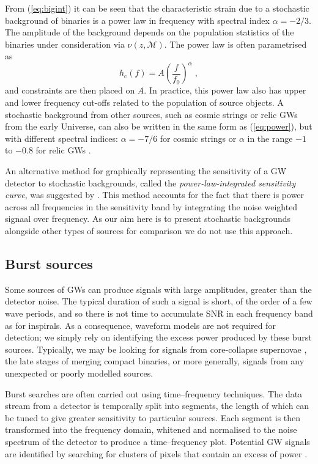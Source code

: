 From (\ref{eq:bigint}) it can be seen that the characteristic strain due to a stochastic background of binaries is a power law in frequency with spectral index $\alpha=-2/3$. The amplitude of the background depends on the population statistics of the binaries under consideration via $\nu(z,{\mathcal{M}})$. The power law is often parametrised as
\begin{equation}\label{eq:power} 
h_\mathrm{c}(f) = A\left(\frac{f}{f_{0}}\right)^{\alpha}\; , 
\end{equation}
and constraints are then placed on $A$. In practice, this power law also has upper and lower frequency cut-offs related to the population of source objects. A stochastic background from other sources, such as cosmic strings or relic GWs from the early Universe, can also be written in the same form as (\ref{eq:power}), but with different spectral indices: $\alpha=-7/6$ for cosmic strings or $\alpha$ in the range $-1$ to $-0.8$ for relic GWs \citep{Jenet}.

An alternative method for graphically representing the sensitivity of a GW detector to stochastic backgrounds, called the \emph{power-law-integrated sensitivity curve}, was suggested by \cite{2013PhRvD..88l4032T}. This method accounts for the fact that there is power across all frequencies in the sensitivity band by integrating the noise weighted signaal over frequency. As our aim here is to present stochastic backgrounds alongside other types of sources for comparison we do not use this approach.


\subsection{Burst sources}\label{sec:bursts}

Some sources of GWs can produce signals with large amplitudes, greater than the detector noise. The typical duration of such a signal is short, of the order of a few wave periods, and so there is not time to accumulate SNR in each frequency band as for inspirals. As a consequence, waveform models are not required for detection; we simply rely on identifying the excess power produced by these burst sources. Typically, we may be looking for signals from core-collapse supernovae \citep{Ott2009}, the late stages of merging compact binaries, or more generally, signals from any unexpected or poorly modelled sources.

Burst searches are often carried out using time--frequency techniques. The data stream from a detector is temporally split into segments, the length of which can be tuned to give greater sensitivity to particular sources. Each segment is then transformed into the frequency domain, whitened and normalised to the noise spectrum of the detector to produce a time--frequency plot. Potential GW signals are identified by searching for clusters of pixels that contain an excess of power \citep[e.g.,][]{Bursts}.

